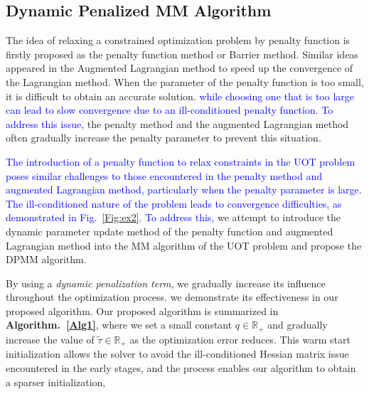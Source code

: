 \documentclass[conference]{IEEEtran}
\newcommand{\R}{\mathbb{R}}
\newcommand{\changeSX}[1]{\textcolor{blue}{#1}}
\begin{document}
\subsection{Dynamic Penalized MM Algorithm}
The idea of relaxing a constrained optimization problem by penalty function is firstly proposed as the penalty function method or Barrier method. Similar ideas appeared in the Augmented Lagrangian method to speed up the convergence of the Lagrangian method. When the parameter of the penalty function is too small, it is difficult to obtain an accurate solution. \changeSX{while choosing one that is too large can lead to slow convergence due to an ill-conditioned penalty function. To address this issue,} the penalty method \cite{349995, adaptive_p} and the augmented Lagrangian method \cite{doi:10.1137/1.9781611973365} often gradually increase the penalty parameter to prevent this situation.

\changeSX{The introduction of a penalty function to relax constraints in the UOT problem poses similar challenges to those encountered in the penalty method and augmented Lagrangian method, particularly when the penalty parameter is large. The ill-conditioned nature of the problem leads to convergence difficulties, as demonstrated in Fig.~\ref{Fig:ex2}. To address this,} we attempt to introduce the dynamic parameter update method of the penalty function and augmented Lagrangian method into the MM algorithm of the UOT problem and propose the DPMM algorithm.

By using a {\it dynamic penalization term}, we gradually increase its influence throughout the optimization process. we demonstrate its effectiveness in our proposed algorithm. Our proposed algorithm is summarized in {\bf Algorithm.~\ref{Alg1}}, where we set a small constant $q \in \R_+ $ and gradually increase the value of $\tilde{\tau}\in \R_+$ as the optimization error reduces. This warm start initialization allows the solver to avoid the ill-conditioned Hessian matrix issue encountered in the early stages, and the process enables our algorithm to obtain a sparser initialization,
\end{document}
